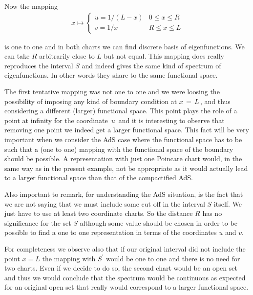 \documentclass[a4paper,12pt]{article}
\begin{document}
Now the mapping
\begin{eqnarray}
x \mapsto \left\{ 
\begin{array}{ll}
u = 1/(L - x) & 0\le x \le R \\
v = 1/ x 	  & R \le x \le L
\end{array}
\right.
\end{eqnarray}

\noindent 
is one to one and in both charts we can find discrete
basis of eigenfunctions. 
We can take $R$  arbitrarily close to $L$ but not equal.
This mapping does really reproduces the interval $S$ and indeed gives the 
same kind of spectrum of eigenfunctions. In other words they share 
to the same functional space. 

The first tentative mapping was not one to one and we were 
loosing the possibility of imposing any kind of boundary condition at 
$x\,=\,L\,$, and thus considering a different (larger) functional space.
This point plays the role of a point at infinity for the coordinate
$\,u\,$ and it is interesting to observe that removing one point we 
indeed get a larger functional space. This fact will be very important 
when we consider the AdS case where the functional space 
has to be such that a (one to one) mapping with the functional space 
of the boundary should be possible.
A representation with just one Poincare chart would, in the same 
way as in the present example, not be appropriate as it would actually
lead to  a larger functional space than that of the compactified AdS.

Also important to remark, for understanding the AdS situation,
is the fact that we are not saying that we must include some cut off 
in the interval $S$ itself. We just have to use at least two coordinate 
charts. So the distance $R$ has no significance for the set $S$ although
some value should be chosen in order to be possible to find a one to one 
representation in terms of the coordinates  $u$ and $v$. 

For completeness we observe also that if our original interval did 
not include the point $x = L$ the mapping with $S^\prime $ would be 
one to one and  there is no need for two charts.
Even if we decide to do so, the second chart would be an open set
and thus we would conclude that the spectrum would be 
continuous as expected for an original open set that really would 
correspond to a larger functional space.


 
\end{document}
